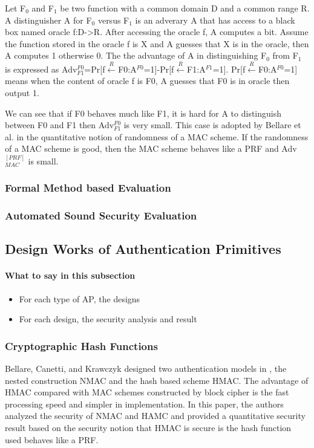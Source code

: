 \documentclass{article}
\begin{document}
Let F$_0$ and F$_1$ be two function with a common domain D and a common range R. A distinguisher A for F$_0$ versus F$_1$ is an adverary A that has access to a black box named oracle f:D->R. After accessing the oracle f, A computes a bit. Assume the function stored in the oracle f is X and A guesses that X is in the oracle, then A computes 1 otherwise 0. The the advantage of A in distinguishing F$_0$ from F$_1$ is expressed as Adv$^{F0}_{F1}$=Pr[f$\stackrel{R}{\longleftarrow}$F0:A$^{F0}$=1]-Pr[f$\stackrel{R}{\longleftarrow}$F1:A$^{F1}$=1]. Pr[f$\stackrel{R}{\longleftarrow}$F0:A$^{F0}$=1] means when the content of oracle f is F0, A guesses that F0 is in oracle then output 1.

We can see that if F0 behaves much like F1, it is hard for A to distinguish between F0 and F1 then Adv$^{F0}_{F1}$ is very small. This case is adopted by Bellare et al. in the quantitative notion of randomness of a MAC scheme. If the randomness of a MAC scheme is good, then the MAC scheme behaves like a PRF and Adv$^{[PRF]}_{MAC}$ is small. 

\subsubsection{Formal Method based Evaluation}
\subsubsection{Automated Sound Security Evaluation}


\subsection{Design Works of Authentication Primitives}
\paragraph{What to say in this subsection}
\begin{itemize}
	\item For each type of AP, the designs
	\item For each design, the security analysis and result
\end{itemize}
\subsubsection{Cryptographic Hash Functions}
Bellare, Canetti, and Krawczyk designed two authentication models in \cite{hmac}, the nested construction NMAC and the hash based scheme HMAC. The advantage of HMAC compared with MAC schemes constructed by block cipher is the fast processing speed and simpler in implementation. 
In this paper, the authors analyzed the security of NMAC and HAMC and provided a quantitative security result based on the security notion that HMAC is secure is the hash function used behaves like a PRF.  
\end{document}

